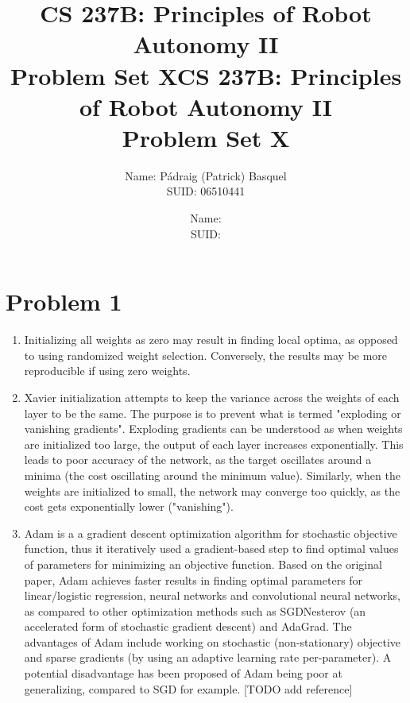 \documentclass{article}
\title{CS 237B: Principles of Robot Autonomy II \\ Problem Set X}
\author{Name: Pádraig (Patrick) Basquel      \\ SUID: 06510441}
\date{}
\title{CS 237B: Principles of Robot Autonomy II \\ Problem Set X}
\author{Name:      \\ SUID:}
\date{}
\begin{document}
\maketitle
\pagestyle{fancy} 


\section*{Problem 1}
\begin{enumerate}[label=(\roman*)]
\item Initializing all weights as zero may result in finding local optima, as opposed to using randomized weight selection. Conversely, the results may be more reproducible if using zero weights.
\item Xavier initialization attempts to keep the variance across the weights of each layer to be the same. The purpose is to prevent what is termed "exploding or vanishing gradients". Exploding gradients can be understood as when weights are initialized too large, the output of each layer increases exponentially. This leads to poor accuracy of the network, as the target oscillates around a minima (the cost oscillating around the minimum value). Similarly, when the weights are initialized to small, the network may converge too quickly, as the cost gets exponentially lower ("vanishing").
\item Adam is a a gradient descent optimization algorithm for stochastic objective function, thus it iteratively used a gradient-based step to find optimal values of parameters for minimizing an objective function. Based on the original paper, Adam achieves faster results in finding optimal parameters for linear/logistic regression, neural networks and convolutional neural networks, as compared to other optimization methods such as SGDNesterov (an accelerated form of stochastic gradient descent) and AdaGrad. The advantages of Adam include working on stochastic (non-stationary) objective and sparse gradients (by using an adaptive learning rate per-parameter). A potential disadvantage has been proposed of Adam being poor at generalizing, compared to SGD for example. [TODO add reference]



\end{enumerate}

\end{document}
